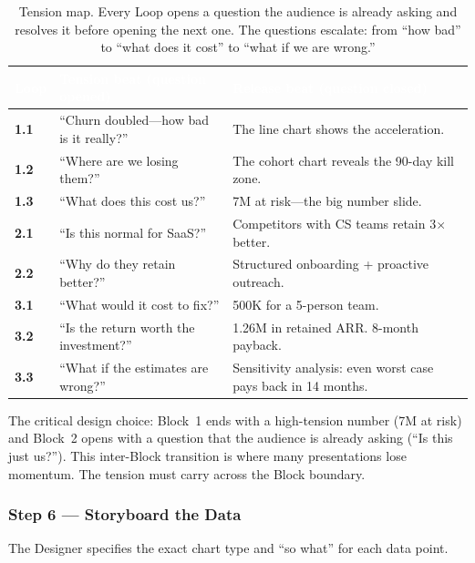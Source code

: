 \begin{table}[H]
\centering
\small
{}
\begin{tabularx}{\textwidth}{>{\bfseries\color{heading}}l X X}
\toprule
\rowcolor{tableheader}
\textcolor{white}{\textbf{Loop}} & \textcolor{white}{\textbf{Tension beat (question opened)}} & \textcolor{white}{\textbf{Release beat (question closed)}} \\
\midrule
1.1 & ``Churn doubled---how bad is it really?'' & The line chart shows the acceleration. \\
1.2 & ``Where are we losing them?'' & The cohort chart reveals the 90-day kill zone. \\
1.3 & ``What does this cost us?'' & \texteuro{}7M at risk---the big number slide. \\
2.1 & ``Is this normal for SaaS?'' & Competitors with CS teams retain 3$\times$ better. \\
2.2 & ``Why do they retain better?'' & Structured onboarding + proactive outreach. \\
3.1 & ``What would it cost to fix?'' & \texteuro{}500K for a 5-person team. \\
3.2 & ``Is the return worth the investment?'' & \texteuro{}1.26M in retained ARR. 8-month payback. \\
3.3 & ``What if the estimates are wrong?'' & Sensitivity analysis: even worst case pays back in 14 months. \\
\bottomrule
\end{tabularx}
\caption{Tension map. Every Loop opens a question the audience is already asking and resolves it before opening the next one. The questions escalate: from ``how bad'' to ``what does it cost'' to ``what if we are wrong.''}
\end{table}

The critical design choice: Block~1 ends with a high-tension number (\texteuro{}7M at risk) and Block~2 opens with a question that the audience is already asking (``Is this just us?''). This inter-Block transition is where many presentations lose momentum. The tension must carry across the Block boundary.

\subsubsection*{Step 6 --- Storyboard the Data}

The Designer specifies the exact chart type and ``so what'' for each data point.


